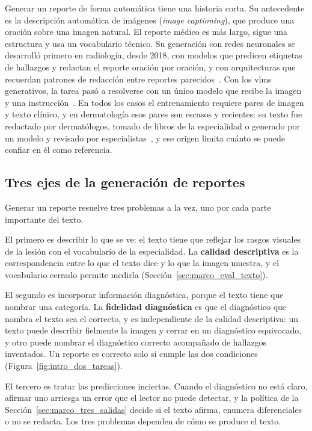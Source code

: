 Generar un reporte de forma automática tiene una historia corta. Su antecedente es la descripción automática
de imágenes (\emph{image captioning}), que produce una oración sobre una imagen natural. El reporte médico es
más largo, sigue una estructura y usa un vocabulario técnico. Su generación con redes neuronales se
desarrolló primero en radiología, desde 2018, con modelos que predicen etiquetas de hallazgos y redactan el reporte oración por
oración, y con arquitecturas que recuerdan patrones de redacción entre reportes
parecidos~\cite{jing2018automatic,chen2020generating}. Con los \glspl{vlm} generativos, la tarea pasó a
resolverse con un único modelo que recibe la imagen y una instrucción~\cite{hartsock2024vision}. En
todos los casos el entrenamiento requiere pares de imagen y texto clínico, y en dermatología esos pares son
escasos y recientes: su texto fue redactado por dermatólogos, tomado de libros de la especialidad o generado
por un modelo y revisado por especialistas~\cite{shen2025skincare,zeng2025mmskin,yan2025derm1miccv}, y ese origen limita cuánto se puede
confiar en él como referencia.

\subsection{Tres ejes de la generación de reportes}
\label{sec:marco_rep_ejes}

Generar un reporte resuelve tres problemas a la vez, uno por cada parte importante del texto.

 El primero es describir lo que se ve: el texto tiene que reflejar los rasgos visuales de la
lesión con el vocabulario de la especialidad. La \textbf{calidad descriptiva} es la correspondencia entre lo
que el texto dice y lo que la imagen muestra, y el vocabulario cerrado permite medirla
(Sección~\ref{sec:marco_eval_texto}).

El segundo es incorporar información diagnóstica, porque el texto tiene que nombrar una categoría. La
\textbf{fidelidad diagnóstica} es que el diagnóstico que nombra el texto sea el correcto, y es independiente de
la calidad descriptiva: un texto puede describir fielmente la imagen y cerrar en un diagnóstico equivocado, y
otro puede nombrar el diagnóstico correcto acompañado de hallazgos inventados. Un reporte es correcto solo si
cumple las dos condiciones (Figura~\ref{fig:intro_dos_tareas}).



El tercero es tratar las predicciones inciertas. Cuando el diagnóstico no está claro, afirmar uno arriesga un
error que el lector no puede detectar, y la política de la Sección~\ref{sec:marco_tres_salidas} decide si el
texto afirma, enumera diferenciales o no se redacta. Los tres problemas dependen de cómo se produce el texto.


